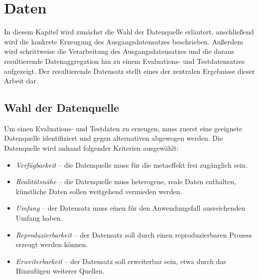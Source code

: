 \chapter{Daten}\label{ch:daten}

In diesem Kapitel wird zunächst die Wahl der Datenquelle erläutert, anschließend wird die konkrete Erzeugung des Ausgangsdatensatzes beschrieben.
Außerdem wird schrittweise die Verarbeitung des Ausgangsdatensatzes und die daraus resultierende Datenaggregation hin zu einem Evaluations- und Testdatensatzes aufgezeigt.
Der resultierende Datensatz stellt eines der zentralen Ergebnisse dieser Arbeit dar.


\section{Wahl der Datenquelle}\label{sec:wahl-der-datenquelle}

Um einen Evaluations- und Testdaten zu erzeugen, muss zuerst eine geeignete Datenquelle identifiziert und gegen alternativen abgewogen werden.
Die Datenquelle wird anhand folgender Kriterien ausgewählt:

\begin{itemize}
    \item \textit{Verfügbarkeit} -- die Datenquelle muss für die metaeffekt frei zugänglich sein.
    \item \textit{Realitätsnähe} -- die Datenquelle muss heterogene, reale Daten enthalten, künstliche Daten sollen weitgehend vermieden werden.
    \item \textit{Umfang} -- der Datensatz muss einen für den Anwendungsfall ausreichenden Umfang haben.
    \item \textit{Reproduzierbarkeit} -- der Datensatz soll durch einen reproduzierbaren Prozess erzeugt werden können.
    \item \textit{Erweiterbarkeit} -- der Datensatz soll erweiterbar sein, etwa durch das Hinzufügen weiterer Quellen.
\end{itemize}

